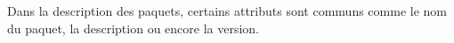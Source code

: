 \documentclass[11pt,fleqn]{book} %
\begin{document}
\vspace{-1cm}
Dans la description des paquets, certains attributs sont communs comme le nom du paquet, la description ou encore la version.\newline
\end{document}
